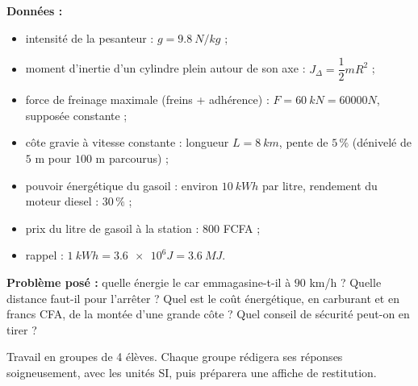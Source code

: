 \documentclass[11pt]{article}
\newcounter{popsec}
\newcounter{popsub}
\newcommand{\courssub}[1]{%
  \stepcounter{popsub}%
  \par\vspace{9pt}\noindent{\popxbold\fontsize{11.5}{13}\selectfont\color{popink}{\color{poporange}\thepopsec.\thepopsub}\hspace{6pt}#1}\par\nopagebreak\vspace{4pt}
}
\begin{document}
\textbf{Données :}
\begin{itemize}
\item intensité de la pesanteur : $g = \SI{9,8}{N/kg}$ ;
\item moment d'inertie d'un cylindre plein autour de son axe : $J_{\Delta} = \dfrac{1}{2}mR^{2}$ ;
\item force de freinage maximale (freins + adhérence) : $F = \SI{60}{kN} = \num{60000}{N}$, supposée constante ;
\item côte gravie à vitesse constante : longueur $L = \SI{8}{km}$, pente de $5\,\%$ (dénivelé de $5$ m pour $100$ m parcourus) ;
\item pouvoir énergétique du gasoil : environ $\SI{10}{kWh}$ par litre, rendement du moteur diesel : $30\,\%$ ;
\item prix du litre de gasoil à la station : $800$ FCFA ;
\item rappel : $\SI{1}{kWh} = \num{3,6e6}{J} = \SI{3,6}{MJ}$.
\end{itemize}

\textbf{Problème posé :} quelle énergie le car emmagasine-t-il à $90$ km/h ? Quelle distance faut-il pour l'arrêter ? Quel est le coût énergétique, en carburant et en francs CFA, de la montée d'une grande côte ? Quel conseil de sécurité peut-on en tirer ?

\courssub{Consignes}

Travail en groupes de 4 élèves. Chaque groupe rédigera ses réponses soigneusement, avec les unités SI, puis préparera une affiche de restitution.
\end{document}
